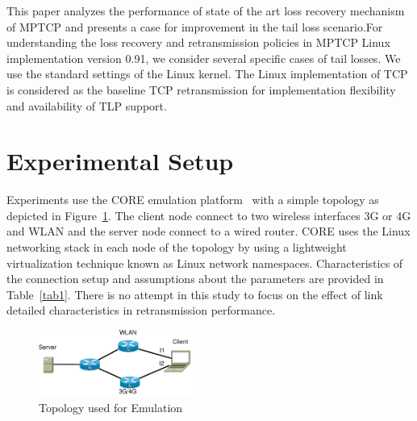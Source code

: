 \documentclass[10pt,conference]{IEEEtran}
\begin{document}

This paper analyzes the performance of state of the art loss recovery mechanism of MPTCP and presents a case for improvement in the tail loss scenario.For understanding the loss recovery and retransmission policies in MPTCP Linux implementation version 0.91, we consider several specific cases of tail losses. We use the standard settings of the Linux kernel. The Linux implementation of TCP is considered as the baseline TCP retransmission for implementation flexibility and availability of TLP support.

\section{Experimental Setup}\label{exsetup}

Experiments use the CORE emulation platform~\cite{CORE} with a simple topology as depicted in Figure~\ref{fig1}. The client node connect to two wireless interfaces 3G or 4G and WLAN and the server node connect to a wired router.
CORE uses the Linux networking stack in each node of the topology by using a lightweight virtualization technique known as Linux network namespaces.
Characteristics of the connection setup and assumptions about the parameters are provided in Table~\ref{tab1}.
There is no attempt in this study to focus on the effect of link detailed characteristics in retransmission performance.

\begin{figure}[!ht]
\begin{center}
\includegraphics[angle=0, width=0.45\textwidth]{images/fortest.pdf}
\caption{Topology used for Emulation}\label{fig1}
\end{center}
\end{figure}
 
\end{document}

